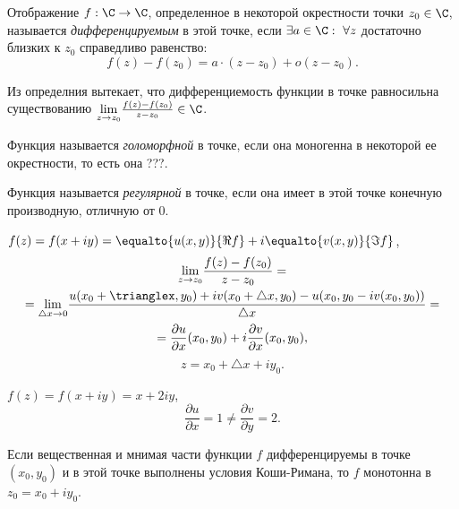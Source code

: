 \begin{definition}
	Отображение $f:\C \rightarrow \C$, определенное в некоторой окрестности точки $z_0 \in \C$, называется \emph{дифференцируемым} в этой точке, если $\exists a \in \C: \ \forall z$ достаточно близких к $z_0$ справедливо равенство:
	\[
		f(z) - f(z_0) = a \cdot (z-z_0) + o(z - z_0).
	\]
\end{definition}

\begin{remark}
	Из определния вытекает, что дифференциемость функции в точке равносильна существованию $\underset{z \rightarrow z_0}{\lim} \frac{f(z)- f(z_0)}{z - z_0} \in \C$.
\end{remark}

\begin{definition}
	Функция называется \emph{голоморфной} в точке, если она моногенна в некоторой ее окрестности, то есть она ???.
\end{definition}

\begin{definition}
	Функция называется \emph{регулярной} в точке, если она имеет в этой точке конечную производную, отличную от 0.
\end{definition}

\begin{remark}
	$f(z) = f(x + iy) = \equalto{u(x,y)}{\Re f} + i \equalto{v(x,y)}{\Im f}$,
	\begin{multline*}
		\underset{z \rightarrow z_0}{\lim} \frac{f(z)-f(z_0)}{z-z_0}  = \\
		= \underset{\triangle x \rightarrow 0}{\lim} \frac{u(x_0 + \trianglex,y_0) + i v(x_0 + \triangle x, y_0) - u(x_0,y_0 - iv(x_0,y_0))}{\triangle x} = \\
		= \frac{\partial u}{\partial x}(x_0,y_0) + i \frac{\partial v}{\partial x} (x_0,y_0),
	\end{multline*}
	\[
		z = x_0 + \triangle x + iy_0.
	\]
\end{remark}

\begin{eg}
	$f(z) = f(x+iy) = x + 2iy$,
	\[
		\frac{\partial u}{\partial x} = 1 \ne \frac{\partial v}{\partial y} = 2.
	\]
\end{eg}

\begin{theorem}
	Если вещественная и мнимая части функции $f$ дифференцируемы в точке $(x_0,y_0)$ и в этой точке выполнены условия Коши-Римана, то $f$ монотонна в $z_0 = x_0 + iy_0$.
\end{theorem}

